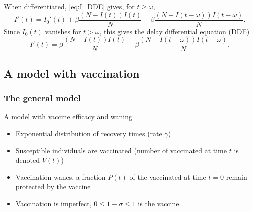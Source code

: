 \documentclass[aspectratio=169]{beamer}\usepackage[]{graphicx}\usepackage[]{xcolor}
\begin{document}
\begin{frame}
When differentiated, \eqref{eq:I_DDE} gives, for $t\geq\omega$,
\[
I'(t)=I_0'(t)+\beta\frac{(N-I(t))I(t)}{N}
-\beta\frac{\left(N-I(t-\omega)\right)I(t-\omega)}{N}.
\]
Since $I_0(t)$ vanishes for $t>\omega$, this gives the delay
differential equation (DDE)
\[
I'(t)=\beta\frac{(N-I(t))I(t)}{N}
-\beta\frac{(N-I(t-\omega))I(t-\omega)}{N}.
\]
\end{frame}






\subsection{A model with vaccination}


\subsubsection{The general model}

\begin{frame}{A model with vaccine efficacy and waning}
\begin{itemize}
\item Exponential distribution of recovery times (rate $\gamma$)
\vfill
\item Susceptible individuals are vaccinated (number of vaccinated at time $t$ is denoted $V(t)$)
\vfill
\item Vaccination wanes, a fraction $P(t)$ of the vaccinated at time $t=0$ remain protected by the vaccine
\vfill
\item Vaccination is imperfect, $0\leq 1-\sigma\leq 1$ is the vaccine 
\end{itemize}
\end{frame}
\end{document}
